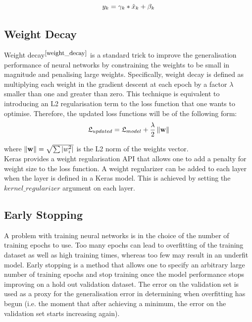 \begin{equation}
  \centering
  y_k = \gamma_k * \hat{x}_k + \beta_k
\end{equation}

\subsection{Weight Decay}
Weight decay$^{\small \cite{weight_decay}}$ is a standard trick to improve the generalisation performance of neural
networks by constraining the weights to be small in magnitude and penalising large weights. Specifically, weight decay is defined as multiplying each weight in the gradient descent at each epoch by a factor $\lambda$ smaller than one and greater than zero. This technique is equivalent to introducing an L2 regularisation term to the loss function that one wants to optimise. Therefore, the updated loss functions will be of the following form: \\

\begin{equation} \label{weight_decay}
  \centering
  \mathfrak{L}_{updated} = \mathfrak{L}_{model} + \frac{\lambda}{2} \norm{\textbf{w}}
\end{equation} 

where $\left\lVert\textbf{w}\right\rVert = \sqrt{\sum |w_i^2|}$ is the L2 norm of the weights vector.\\

Keras provides a weight regularisation API that allows one to add a penalty for weight size to the loss function. A weight regularizer can be added to each layer when the layer is defined in a Keras model. This is achieved by setting the $kernel\_regularizer$ argument on each layer.

\subsection{Early Stopping}
A problem with training neural networks is in the choice of the number of training epochs to use. Too many epochs can lead to overfitting of the training dataset as well as high training times, whereas too few may result in an underfit model. Early stopping is a method that allows one to specify an arbitrary large number of training epochs and stop training once the model performance stops improving on a hold out validation dataset. The error on the validation set is used as a proxy for the generalisation error in determining when overfitting has begun (i.e. the moment that after achieving a minimum, the error on the validation set starts increasing again).\\


